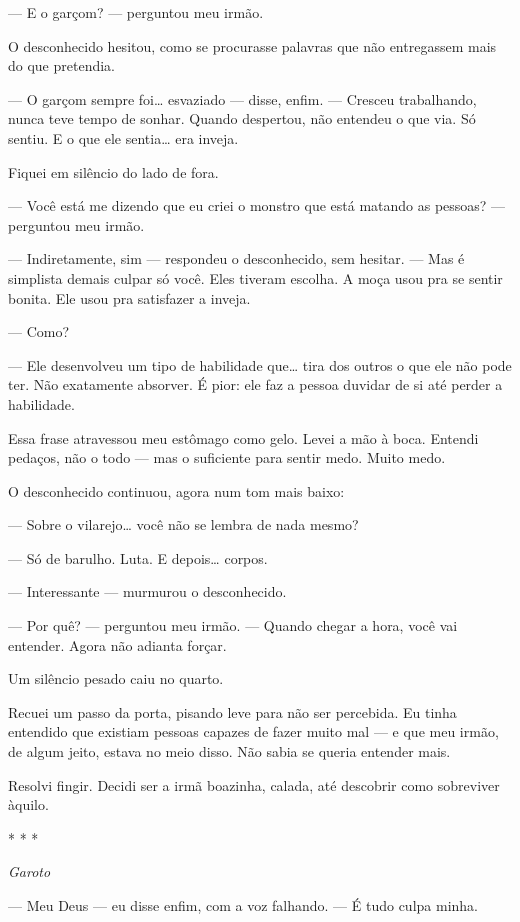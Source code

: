 — E o garçom? — perguntou meu irmão.

O desconhecido hesitou, como se procurasse palavras que não entregassem mais do que pretendia.

— O garçom sempre foi… esvaziado — disse, enfim. — Cresceu trabalhando, nunca teve tempo de sonhar.
Quando despertou, não entendeu o que via. Só sentiu.  
E o que ele sentia… era inveja.

Fiquei em silêncio do lado de fora.

— Você está me dizendo que eu criei o monstro que está matando as pessoas? — perguntou meu irmão.

— Indiretamente, sim — respondeu o desconhecido, sem hesitar. — Mas é simplista demais culpar só você.
Eles tiveram escolha.  
A moça usou pra se sentir bonita.  
Ele usou pra satisfazer a inveja.

— Como?

— Ele desenvolveu um tipo de habilidade que… tira dos outros o que ele não pode ter.  
Não exatamente absorver.  
É pior: ele faz a pessoa duvidar de si até perder a habilidade.

Essa frase atravessou meu estômago como gelo.
Levei a mão à boca.
Entendi pedaços, não o todo — mas o suficiente para sentir medo.
Muito medo.

O desconhecido continuou, agora num tom mais baixo:

— Sobre o vilarejo… você não se lembra de nada mesmo?

— Só de barulho. Luta. E depois… corpos.

— Interessante — murmurou o desconhecido.

— Por quê? — perguntou meu irmão.
— Quando chegar a hora, você vai entender. Agora não adianta forçar.

Um silêncio pesado caiu no quarto.

Recuei um passo da porta, pisando leve para não ser percebida.
Eu tinha entendido que existiam pessoas capazes de fazer muito mal — e que meu irmão, de algum jeito, estava no meio disso.
Não sabia se queria entender mais.

Resolvi fingir.
Decidi ser a irmã boazinha, calada, até descobrir como sobreviver àquilo.

\begin{center}
* * *

\textit{Garoto}
\end{center}

— Meu Deus — eu disse enfim, com a voz falhando. — É tudo culpa minha.

